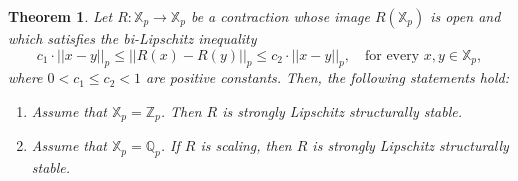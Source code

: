 \documentclass[10pt,a4paper]{amsart}
\newtheorem{theorem}{Theorem}
\begin{document}
	\begin{theorem}\label{Theor3_Contractions in p-adics}  
		Let $R: \mathbb{X}_{p} \to \mathbb{X}_{p}$ be a contraction whose image $R \left(  \mathbb{X}_{p}  \right) $ is open and which satisfies the bi-Lipschitz inequality 
		\begin{equation}\label{Eq2_Bi-Lipschitz Contractions}
			c_{1}\cdot  \left| \left|  x -y  \right|  \right|_{p}   \le       \left| \left|  R(x) - R(y)  \right|  \right|_{p}   \le   c_{2} \cdot  \left| \left|  x -y  \right|  \right|_{p}, \quad \text{for every }  x,y \in \mathbb{X}_{p},  
		\end{equation}
		where $ 0  < c_{1} \le c_{2}  < 1 $ are positive constants.  Then, the following statements hold:
		\begin{enumerate}
			
			
			\item Assume that $\mathbb{X}_{p} = \mathbb{Z}_{p}$. Then $R$ is strongly Lipschitz structurally stable. 
			
			
			\item Assume that $\mathbb{X}_{p} = \mathbb{Q}_{p}$. If $R$ is scaling, then $R$ is strongly Lipschitz structurally stable.
			
			
			
		\end{enumerate}
		
	\end{theorem}
\end{document}
